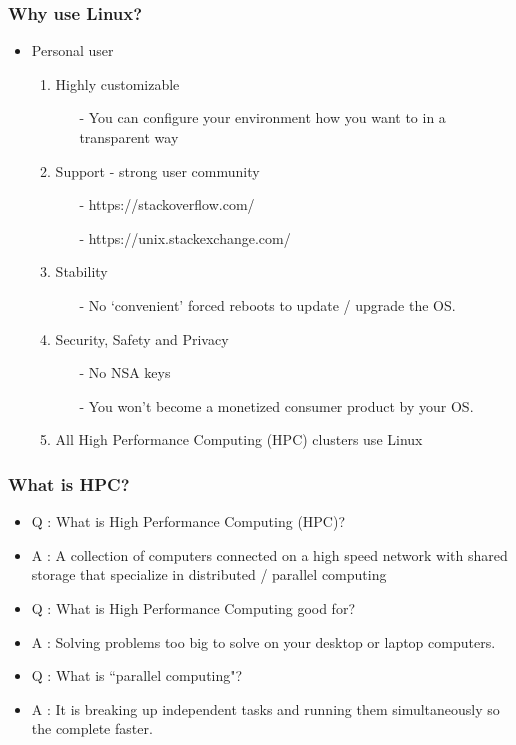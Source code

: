 \documentclass{beamer}
\begin{document}
\begin{frame}
\frametitle{Why use Linux?}
\begin{itemize}
    \item Personal user
    \begin{enumerate}
        \pause
        \item Highly customizable
        \begin{itemize}
            \pause
            \item[-] You can configure your environment how you want to in a transparent way
        \end{itemize}
        \pause
        \item Support - strong user community
        \begin{itemize}
            \item[-] https://stackoverflow.com/
            \pause
            \item[-] https://unix.stackexchange.com/
        \end{itemize}
        \pause
        \item Stability
        \begin{itemize}
            \pause
            \item[-] No `convenient' forced reboots to update / upgrade the OS.
        \end{itemize}
        \pause
        \item Security, Safety and Privacy
        \begin{itemize}
            \pause
            \item[-] No NSA keys
            \pause
            \item[-] You won't become a monetized consumer product by your OS.
        \end{itemize}
        \pause
        \item All High Performance Computing (HPC) clusters use Linux
    \end{enumerate}
\end{itemize}
\end{frame}


\begin{frame}
\frametitle{What is HPC?}
\begin{itemize}
    \item Q : What is High Performance Computing (HPC)?
    \pause
    \item A : A collection of computers connected on a high speed network with
              shared storage that specialize in distributed / parallel computing
    \pause
    \bigskip
    \item Q : What is High Performance Computing good for?
    \pause
    \item A : Solving problems too big to solve on your desktop or laptop computers.
    \pause
    \bigskip
    \item Q : What is ``parallel computing"?
    \pause
    \item A : It is breaking up independent tasks and running them simultaneously so the complete faster.
    \bigskip
\end{itemize}
\end{frame}
\end{document}
